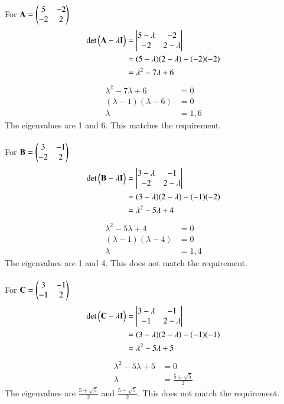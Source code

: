 \documentclass[journal]{IEEEtran}
\begin{document}
For $\mathbf{A}=\begin{pmatrix}5 & -2 \\ -2 & 2\end{pmatrix}$
\begin{align}
\det\begin{pmatrix}\mathbf{A} - \lambda \mathbf{I}\end{pmatrix} &= \begin{vmatrix}
5-\lambda & -2\\
-2 & 2-\lambda
\end{vmatrix} \\
&= (5-\lambda)(2-\lambda)-(-2)(-2) \\
&= \lambda^2 - 7\lambda + 6 \\
\end{align}
\begin{align}
\lambda^2 - 7\lambda + 6 &= 0 \\
(\lambda - 1)(\lambda - 6) &= 0 \\
\lambda &= 1, 6
\end{align}
The eigenvalues are 1 and 6. This matches the requirement.\\\\
For $\mathbf{B}=\begin{pmatrix}3 & -1 \\ -2 & 2\end{pmatrix}$
\begin{align}
\det\begin{pmatrix}\mathbf{B} - \lambda \mathbf{I}\end{pmatrix} &= \begin{vmatrix}
3-\lambda & -1\\
-2 & 2-\lambda
\end{vmatrix} \\
&= (3-\lambda)(2-\lambda)-(-1)(-2) \\
&= \lambda^2 - 5\lambda + 4 \\
\end{align}
\begin{align}
\lambda^2 - 5\lambda + 4 &= 0 \\
(\lambda - 1)(\lambda - 4) &= 0 \\
\lambda &= 1, 4
\end{align}
The eigenvalues are 1 and 4. This does not match the requirement.\\\\
For $\mathbf{C}=\begin{pmatrix}3 & -1 \\ -1 & 2\end{pmatrix}$
\begin{align}
\det\begin{pmatrix}\mathbf{C} - \lambda \mathbf{I}\end{pmatrix} &= \begin{vmatrix}
3-\lambda & -1\\
-1 & 2-\lambda
\end{vmatrix} \\
&= (3-\lambda)(2-\lambda)-(-1)(-1) \\
&= \lambda^2 - 5\lambda + 5 \\
\end{align}
\begin{align}
\lambda^2 - 5\lambda + 5 &= 0 \\
\lambda &=\frac{5 \pm \sqrt{5}}{2}
\end{align}
The eigenvalues are $\frac{5 + \sqrt{5}}{2}$ and $\frac{5 - \sqrt{5}}{2}$. This does not match the requirement.\\\\
\end{document}
